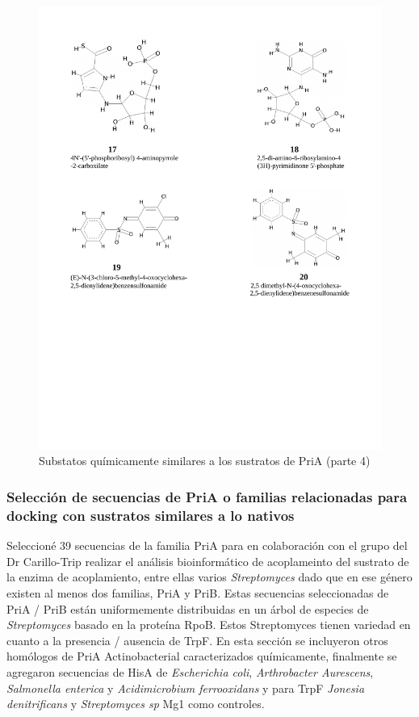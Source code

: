 \documentclass[]{article}
\begin{document}
{\begin{figure}[h!tbp]
\centering
\includegraphics[angle = 0,scale = .8]{chapter4/esquema_quimico-4-4.pdf}
\caption[Substatos químicamente similares a los sustratos de PriA (parte 4)]{\footnotesize{Substatos químicamente similares a los sustratos de PriA (parte 4)}}
\label{fig:Eschema4}
\end{figure}

\clearpage  

\subsubsection{Selección de secuencias de PriA o familias relacionadas
para docking con sustratos similares a lo
nativos}\label{seleccion-de-secuencias-de-pria-o-familias-relacionadas-para-docking-con-sustratos-similares-a-lo-nativos}

Seleccioné 39 secuencias de la familia PriA para en colaboración con el
grupo del Dr Carillo-Trip realizar el análisis bioinformático de
acoplameinto del sustrato de la enzima de acoplamiento, entre ellas
varios \emph{Streptomyces} dado que en ese género existen al menos dos
familias, PriA y PriB. Estas secuencias seleccionadas de PriA / PriB
están uniformemente distribuidas en un árbol de especies de
\emph{Streptomyces} basado en la proteína RpoB. Estos Streptomyces
tienen variedad en cuanto a la presencia / ausencia de TrpF. En esta
sección se incluyeron otros homólogos de PriA Actinobacterial
caracterizados químicamente, finalmente se agregaron secuencias de HisA
de \emph{Escherichia coli}, \emph{Arthrobacter Aurescens},
\emph{Salmonella enterica} y \emph{Acidimicrobium ferrooxidans} y para
TrpF \emph{Jonesia denitrificans} y \emph{Streptomyces sp } Mg1 como
controles.

}
\end{document}
